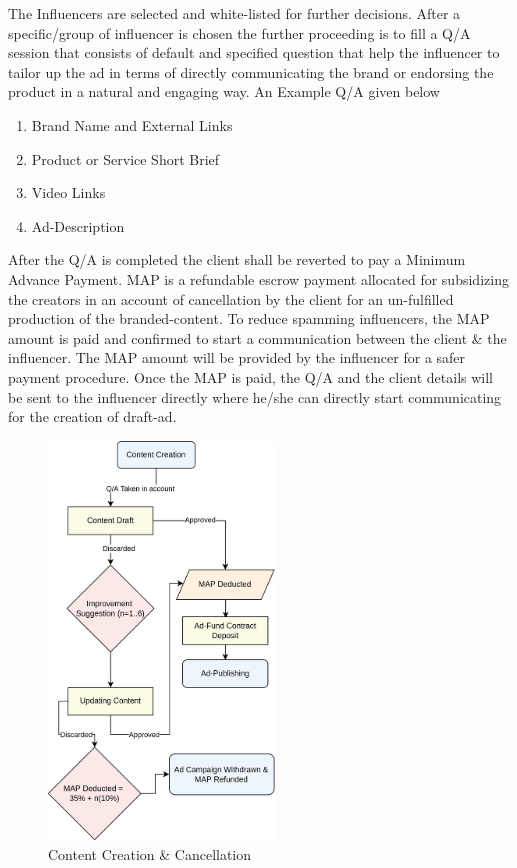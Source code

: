 \documentclass[letterpaper,11pt]{article}
\begin{document}
The Influencers are selected and white-listed for further decisions. After a specific/group of influencer is chosen the further proceeding is to fill a Q/A session that consists of default and specified question that help the influencer to tailor up the ad in terms of directly communicating the brand or endorsing the product in a natural and engaging way. An Example Q/A given below
\begin{enumerate}[wide, labelwidth=!, labelindent=0pt]
\item Brand Name and External Links
\item Product or Service Short Brief
\item Video Links
\item Ad-Description
\end{enumerate}
After the Q/A is completed the client shall be reverted to pay a Minimum Advance Payment. MAP is a refundable escrow payment allocated for subsidizing the creators in an account of cancellation by the client for an un-fulfilled production of the branded-content. To reduce spamming influencers, the MAP amount is paid and confirmed to start a communication between the client \& the influencer. The MAP amount will be provided by the influencer for a safer payment procedure. Once the MAP is paid, the Q/A and the client details will be sent to the influencer directly where he/she can directly start communicating for the creation of draft-ad.

\begin{figure}[H]
\begin{center}
\includegraphics[width=6cm]{ad-content}
\caption{Content Creation \& Cancellation}
\end{center}
\end{figure}
\end{document}

